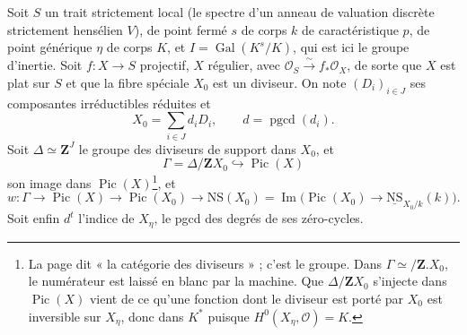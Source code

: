 \documentclass[11pt,a4paper]{article}
\begin{document}
Soit $S$ un trait strictement local (le spectre d'un anneau de valuation discrète
strictement hensélien $V$), de point fermé $s$ de corps $k$ de caractéristique $p$,
de point générique $\eta$ de corps $K$, et $I = \operatorname{Gal}(K^s/K)$, qui
est ici le groupe d'inertie. Soit $f\colon X \to S$ projectif, $X$ régulier, avec
$\mathcal{O}_S \xrightarrow{\sim} f_*\mathcal{O}_X$, de sorte que $X$ est plat sur
$S$ et que la fibre spéciale $X_0$ est un diviseur. On note $(D_i)_{i \in J}$ ses
composantes irréductibles réduites et
\[ X_0 = \sum_{i \in J} d_iD_i, \qquad d = \operatorname{pgcd}(d_i) . \]
Soit $\Delta \simeq \mathbf{Z}^J$ le groupe des diviseurs de support dans $X_0$, et
\[ \Gamma = \Delta / \mathbf{Z}X_0 \hookrightarrow \operatorname{Pic}(X)
\]
son image dans $\operatorname{Pic}(X)$\footnote{La page dit « la catégorie des
diviseurs » ; c'est le groupe. Dans $\Gamma \simeq {}/\mathbf{Z}.X_0$, le
numérateur est laissé en blanc par la machine. Que $\Delta/\mathbf{Z}X_0$
s'injecte dans $\operatorname{Pic}(X)$ vient de ce qu'une fonction dont le
diviseur est porté par $X_0$ est inversible sur $X_\eta$, donc dans $K^*$ puisque
$H^0(X_\eta, \mathcal{O}) = K$.}, et
\[ w\colon \Gamma \to \operatorname{Pic}(X) \to \operatorname{Pic}(X_0) \to
\mathrm{NS}(X_0) = \operatorname{Im}\bigl(\operatorname{Pic}(X_0) \to
\underline{\mathrm{NS}}_{X_0/k}(k)\bigr) . \]
Soit enfin $d^t$ l'indice de $X_\eta$, le pgcd des degrés de ses zéro-cycles.
\end{document}
